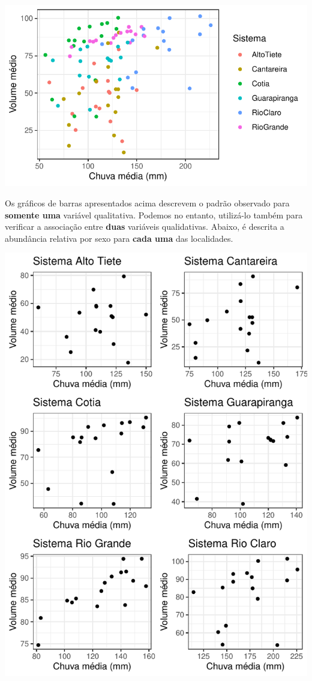 \documentclass[
]{book}
\begin{document}
\begin{center}\includegraphics{probest-cambientais_files/figure-latex/unnamed-chunk-26-1} \end{center}

Os gráficos de barras apresentados acima descrevem o padrão observado para \textbf{somente uma} variável qualitativa. Podemos no entanto, utilizá-lo também para verificar a associação entre \textbf{duas} variáveis qualidativas. Abaixo, é descrita a abundância relativa por sexo para \textbf{cada uma} das localidades.

\begin{center}\includegraphics{probest-cambientais_files/figure-latex/unnamed-chunk-27-1} \end{center}
\end{document}
